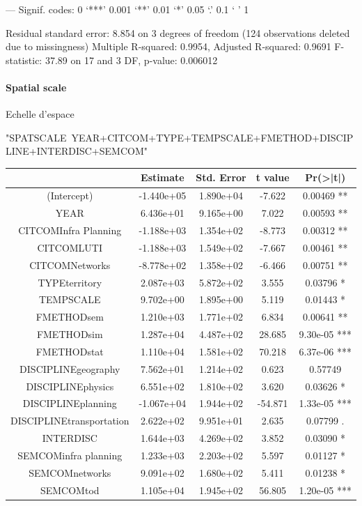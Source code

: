 ---
Signif. codes:  0 ‘***’ 0.001 ‘**’ 0.01 ‘*’ 0.05 ‘.’ 0.1 ‘ ’ 1

Residual standard error: 8.854 on 3 degrees of freedom
  (124 observations deleted due to missingness)
Multiple R-squared:  0.9954,	Adjusted R-squared:  0.9691 
F-statistic: 37.89 on 17 and 3 DF,  p-value: 0.006012

\paragraph{Spatial scale}{Echelle d'espace}


"SPATSCALE~YEAR+CITCOM+TYPE+TEMPSCALE+FMETHOD+DISCIPLINE+INTERDISC+SEMCOM"


\begin{tabular}{|c|c|c|c|c|}
\hline
                      &     Estimate & Std. Error & t value & Pr(>|t|)    \\\hline
(Intercept)           &   -1.440e+05 & 1.890e+04 & -7.622 & 0.00469 ** \\
YEAR                   &   6.436e+01 & 9.165e+00 &  7.022 & 0.00593 ** \\
CITCOMInfra Planning   &  -1.188e+03 & 1.354e+02 & -8.773 & 0.00312 ** \\
CITCOMLUTI             &  -1.188e+03 & 1.549e+02 & -7.667 & 0.00461 ** \\
CITCOMNetworks         &  -8.778e+02 & 1.358e+02 & -6.466 & 0.00751 ** \\
TYPEterritory          &   2.087e+03 & 5.872e+02 &  3.555 & 0.03796 *  \\
TEMPSCALE              &   9.702e+00 & 1.895e+00 &  5.119 & 0.01443 *  \\
FMETHODsem             &   1.210e+03 & 1.771e+02 &  6.834 & 0.00641 ** \\
FMETHODsim             &   1.287e+04 & 4.487e+02 & 28.685 & 9.30e-05 *** \\
FMETHODstat            &   1.110e+04 & 1.581e+02 & 70.218 & 6.37e-06 ***\\
DISCIPLINEgeography    &   7.562e+01 & 1.214e+02 &  0.623 & 0.57749    \\
DISCIPLINEphysics      &   6.551e+02 & 1.810e+02 &  3.620 & 0.03626 *  \\
DISCIPLINEplanning     &  -1.067e+04 & 1.944e+02 & -54.871 & 1.33e-05 ***\\
DISCIPLINEtransportation &  2.622e+02 & 9.951e+01 &  2.635 & 0.07799 .  \\
INTERDISC              &   1.644e+03 & 4.269e+02  & 3.852 & 0.03090 *  \\
SEMCOMinfra planning   &   1.233e+03 & 2.203e+02  & 5.597 & 0.01127 *  \\
SEMCOMnetworks         &   9.091e+02 & 1.680e+02  & 5.411 & 0.01238 *  \\
SEMCOMtod              &   1.105e+04 & 1.945e+02  & 56.805 & 1.20e-05 ***\\\hline
\end{tabular}

